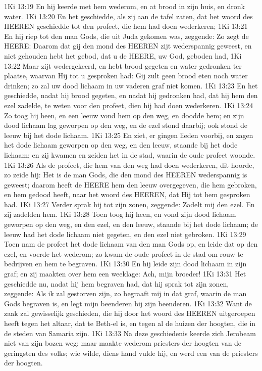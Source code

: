 1Ki 13:19  En hij keerde met hem wederom, en at brood in zijn huis, en dronk water.
1Ki 13:20  En het geschiedde, als zij aan de tafel zaten, dat het woord des HEEREN geschiedde tot den profeet, die hem had doen wederkeren;
1Ki 13:21  En hij riep tot den man Gods, die uit Juda gekomen was, zeggende: Zo zegt de HEERE: Daarom dat gij den mond des HEEREN zijt wederspannig geweest, en niet gehouden hebt het gebod, dat u de HEERE, uw God, geboden had,
1Ki 13:22  Maar zijt wedergekeerd, en hebt brood gegeten en water gedronken ter plaatse, waarvan Hij tot u gesproken had: Gij zult geen brood eten noch water drinken; zo zal uw dood lichaam in uw vaderen graf niet komen.
1Ki 13:23  En het geschiedde, nadat hij brood gegeten, en nadat hij gedronken had, dat hij hem den ezel zadelde, te weten voor den profeet, dien hij had doen wederkeren.
1Ki 13:24  Zo toog hij heen, en een leeuw vond hem op den weg, en doodde hem; en zijn dood lichaam lag geworpen op den weg, en de ezel stond daarbij; ook stond de leeuw bij het dode lichaam.
1Ki 13:25  En ziet, er gingen lieden voorbij, en zagen het dode lichaam geworpen op den weg, en den leeuw, staande bij het dode lichaam; en zij kwamen en zeiden het in de stad, waarin de oude profeet woonde.
1Ki 13:26  Als de profeet, die hem van den weg had doen wederkeren, dit hoorde, zo zeide hij: Het is de man Gods, die den mond des HEEREN wederspannig is geweest; daarom heeft de HEERE hem den leeuw overgegeven, die hem gebroken, en hem gedood heeft, naar het woord des HEEREN, dat Hij tot hem gesproken had.
1Ki 13:27  Verder sprak hij tot zijn zonen, zeggende: Zadelt mij den ezel. En zij zadelden hem.
1Ki 13:28  Toen toog hij heen, en vond zijn dood lichaam geworpen op den weg, en den ezel, en den leeuw, staande bij het dode lichaam; de leeuw had het dode lichaam niet gegeten, en den ezel niet gebroken.
1Ki 13:29  Toen nam de profeet het dode lichaam van den man Gods op, en leide dat op den ezel, en voerde het wederom; zo kwam de oude profeet in de stad om rouw te bedrijven en hem te begraven.
1Ki 13:30  En hij leide zijn dood lichaam in zijn graf; en zij maakten over hem een weeklage: Ach, mijn broeder!
1Ki 13:31  Het geschiedde nu, nadat hij hem begraven had, dat hij sprak tot zijn zonen, zeggende: Als ik zal gestorven zijn, zo begraaft mij in dat graf, waarin de man Gods begraven is, en legt mijn beenderen bij zijn beenderen.
1Ki 13:32  Want de zaak zal gewisselijk geschieden, die hij door het woord des HEEREN uitgeroepen heeft tegen het altaar, dat te Beth-el is, en tegen al de huizen der hoogten, die in de steden van Samaria zijn.
1Ki 13:33  Na deze geschiedenis keerde zich Jerobeam niet van zijn bozen weg; maar maakte wederom priesters der hoogten van de geringsten des volks; wie wilde, diens hand vulde hij, en werd een van de priesters der hoogten.

